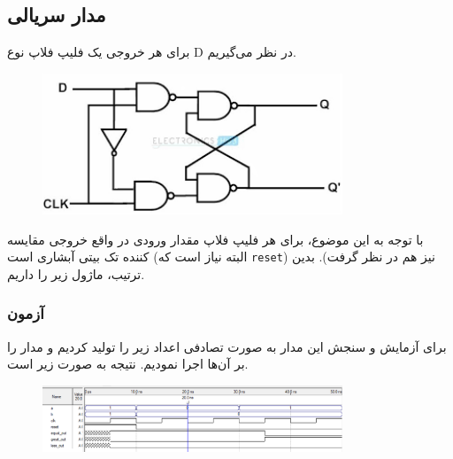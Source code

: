 \documentclass{perassignments}
\newcommand{\vars}[1]{\texttt{#1}}
\begin{document}
	\subsection{مدار سریالی}
برای هر خروجی یک فلیپ فلاپ نوع D در نظر می‌گیریم.
	\begin{figure}[H]
	\centering
	\includegraphics[width = 0.8\textwidth]{graphics/dff.png}
\end{figure}
	با توجه به این موضوع، برای هر فلیپ فلاپ مقدار ورودی در واقع خروجی مقایسه کننده تک بیتی آبشاری است (البته نیاز است که \vars{reset}) نیز هم در نظر گرفت). بدین ترتیب، ماژول زیر را داریم.
	\begin{latin}
		\raggedleft
		
	\end{latin}
	\subsubsection{آزمون}
	برای آزمایش و سنجش این مدار به صورت تصادفی اعداد زیر را تولید کردیم و مدار را بر آن‌ها اجرا نمودیم. نتیجه 
	به صورت زیر است.
	\begin{figure}[H]
		\centering
		\includegraphics[width = 0.8\textwidth]{graphics/wavecomp.png}
	\end{figure}
\end{document}
